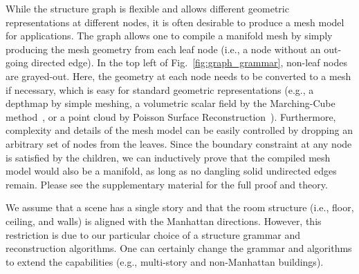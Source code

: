  While the structure graph is flexible
and allows different geometric representations at different nodes, it is
often desirable to produce a mesh model for applications.
The graph allows one to compile a manifold mesh by simply producing the
mesh geometry from each leaf node (i.e., a node without an out-going
directed edge). In the top left of Fig.~\ref{fig:graph_grammar},
non-leaf nodes are grayed-out. Here, the geometry at each node needs to
be converted to a mesh if necessary, which is easy for standard
geometric representations (e.g., a depthmap by simple meshing, a
volumetric scalar field by the Marching-Cube method~\cite{MarchingCube},
or a point cloud by Poisson Surface
Reconstruction~\cite{shan2014occluding}). Furthermore,
complexity and details of the mesh model can be easily controlled by dropping an arbitrary set of nodes from the
leaves. Since the boundary constraint at any node is satisfied by the
children, we can inductively prove that the compiled mesh model would
also be a manifold, as long as no dangling solid undirected edges
remain. Please see the supplementary material for the full proof and theory.


 We assume that a scene has a single story
and that the room structure (i.e., floor, ceiling, and walls) is aligned
with the Manhattan directions. However, this restriction is due to our
particular choice of a structure grammar and reconstruction
algorithms. One can certainly change the grammar and algorithms to
extend the capabilities (e.g., multi-story and non-Manhattan buildings).
%



